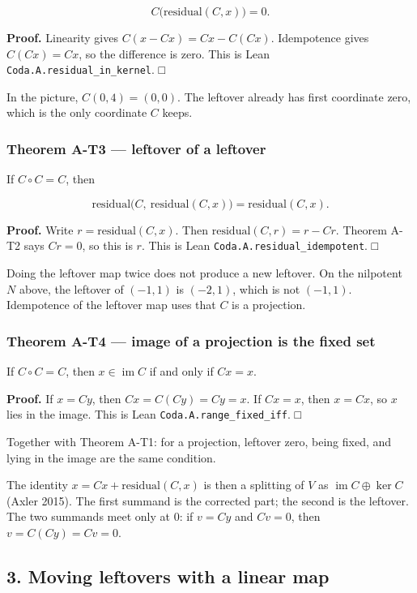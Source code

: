 \documentclass[
  11pt,
]{article}
\begin{document}
\[
C\bigl(\mathrm{residual}(C,x)\bigr)=0.
\]

\textbf{Proof.} Linearity gives \(C(x-Cx)=Cx-C(Cx)\). Idempotence gives \(C(Cx)=Cx\), so the difference is zero. This is Lean \nolinkurl{Coda.A.residual_in_kernel}. □

In the picture, \(C(0,4)=(0,0)\). The leftover already has first coordinate zero, which is the only coordinate \(C\) keeps.

\subsubsection{Theorem A-T3 --- leftover of a leftover}\label{theorem-a-t3-leftover-of-a-leftover}

If \(C\circ C=C\), then

\[
\mathrm{residual}\bigl(C,\ \mathrm{residual}(C,x)\bigr)
=
\mathrm{residual}(C,x).
\]

\textbf{Proof.} Write \(r=\mathrm{residual}(C,x)\). Then \(\mathrm{residual}(C,r)=r-Cr\). Theorem A-T2 says \(Cr=0\), so this is \(r\). This is Lean \nolinkurl{Coda.A.residual_idempotent}. □

Doing the leftover map twice does not produce a new leftover. On the nilpotent \(N\) above, the leftover of \((-1,1)\) is \((-2,1)\), which is not \((-1,1)\). Idempotence of the leftover map uses that \(C\) is a projection.

\subsubsection{Theorem A-T4 --- image of a projection is the fixed set}\label{theorem-a-t4-image-of-a-projection-is-the-fixed-set}

If \(C\circ C=C\), then \(x\in\operatorname{im} C\) if and only if \(Cx=x\).

\textbf{Proof.} If \(x=Cy\), then \(Cx=C(Cy)=Cy=x\). If \(Cx=x\), then \(x=Cx\), so \(x\) lies in the image. This is Lean \nolinkurl{Coda.A.range_fixed_iff}. □

Together with Theorem A-T1: for a projection, leftover zero, being fixed, and lying in the image are the same condition.

The identity \(x=Cx+\mathrm{residual}(C,x)\) is then a splitting of \(V\) as \(\operatorname{im} C\oplus\ker C\) (Axler 2015). The first summand is the corrected part; the second is the leftover. The two summands meet only at \(0\): if \(v=Cy\) and \(Cv=0\), then \(v=C(Cy)=Cv=0\).

\subsection{3. Moving leftovers with a linear map}\label{moving-leftovers-with-a-linear-map}
\end{document}
